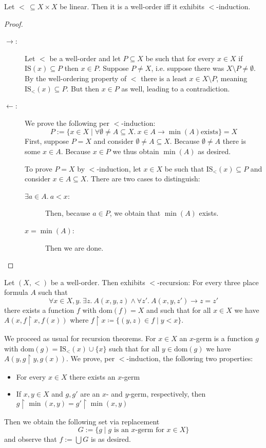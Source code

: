 \documentclass{whrartcl}
\newcommand{\dom}{\text{dom}}
\newcommand{\IS}{\text{IS}}
\newcommand{\uh}{\upharpoonright}
\begin{document}
\begin{theorem}
  Let $<\, \subseteq X \times X$ be linear. Then it is a well-order iff it
  exhibits $<$-induction.
\end{theorem}
\begin{proof}
  \
  \begin{description}
  \item[$\to$:] Let $<$ be a well-order and let $P \subseteq X$ be such that for
    every $x \in X$ if $\IS(x) \subseteq P$ then $x \in P$. Suppose $P \neq X$,
    i.e. suppose there was $X \setminus P \neq \emptyset$. By the well-ordering
    property of $<$ there is a least $x \in X \setminus P$, meaning $\IS_<(x)
    \subseteq P$. But then $x \in P$ as well, leading to a contradiction.
  \item[$\leftarrow$:] We prove the following per $<$-induction:
    \[
      P := \{x \in X \mid \forall \emptyset \neq A \subseteq X.~x \in A \to \min(A) \text{
        exists}\} = X
    \]
    First, suppose $P = X$ and consider $\emptyset \neq A \subseteq X$. Because
    $\emptyset \neq A$ there is some $x \in A$. Because $x \in P$ we thus obtain
    $\min(A)$ as desired.

    To prove $P = X$ by $<$-induction, let $x \in X$ be such that $\IS_<(x)
    \subseteq P$ and consider $x \in A \subseteq X$. There are two cases to
    distinguish:
    \begin{description}
    \item[$\exists a \in A.~a < x$:] Then, because $a \in P$, we obtain that
      $\min(A)$ exists.
    \item[$x = \min(A)$:] Then we are done.
    \end{description}
  \end{description}
\end{proof}

\begin{theorem}
  Let $(X, <)$ be a well-order. Then exhibits $<$-recursion: For every three place formula $A$ such that
    \[
      \forall x \in X, y.~\exists z.~A(x, y, z) \wedge \forall z'.~A(x, y, z')
      \to z = z'
    \]
    there exists a function $f$ with $\dom(f) = X$ and such that for all $x \in
    X$ we have $A(x, f \uh x, f(x))$ where $f \uh x \coloneq \{(y, z) \in f \mid
    y < x\}$.
\end{theorem}
\begin{proofsketch}
  We proceed as usual for recursion theorems. For $x \in X$ an $x$-germ is a function
  $g$ with $\dom(g) = \IS_<(x) \cup \{x\}$ such that for all $y \in
  \dom(g)$ we have $A(y, g \uh y, g(x))$. We prove, per $<$-induction, the following
  two properties:
  \begin{itemize}
  \item For every $x \in X$ there exists an $x$-germ
  \item If $x, y \in X$ and $g, g'$ are an $x$- and $y$-germ, respectively, then
    $g \uh \min(x, y) = g' \uh \min(x, y)$
  \end{itemize}
  Then we obtain the following set via replacement
  \[
    G := \{g \mid g \text{ is an } x\text{-germ for } x \in X\}
  \]
  and observe that $f := \bigcup G$ is as desired.
\end{proofsketch}
\end{document}
